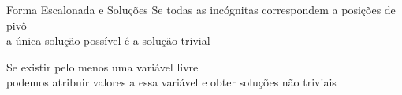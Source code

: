 \documentclass[fleqn,aspectratio=169,12pt]{beamer}
\begin{document}


\begin{frame}{Forma Escalonada e Soluções}
  Se todas as incógnitas correspondem a posições de pivô
  \\ \pause
  a única solução possível é a solução trivial

  \pause
  \bigskip

  Se existir pelo menos uma variável livre
  \\ \pause
  podemos atribuir valores a essa variável e obter soluções não triviais
\end{frame}




%
%

\end{document}
